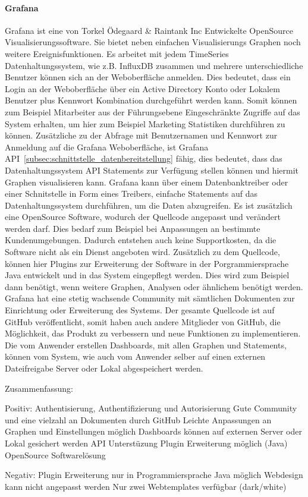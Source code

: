 \paragraph{Grafana}
\label{paragraph:grafana}
Grafana ist eine von Torkel Ödegaard \& Raintank Inc Entwickelte OpenSource
Visualisierungssoftware. Sie bietet neben einfachen Visualisierungs Graphen
noch weitere Ereignisfunktionen. Es arbeitet mit jedem TimeSeries
Datenhaltungssystem, wie z.B. InfluxDB zusammen und mehrere unterschiedliche
Benutzer können sich an der Weboberfläche anmelden. Dies bedeutet, dass ein
Login an der Weboberfläche über ein Active Directory Konto oder Lokalem
Benutzer plus Kennwort Kombination durchgeführt werden kann. Somit können zum
Beispiel Mitarbeiter aus der Führungsebene Eingeschränkte Zugriffe auf das
System erhalten, um hier zum Beispiel Marketing Statistiken durchführen zu
können. Zusätzliche zu der Abfrage mit Benutzernamen und Kennwort zur Anmeldung
auf die Grafana Weboberfläche, ist Grafana
API~\ref{subsec:schnittstelle_datenbereitstellung} fähig, dies bedeutet, dass
das Datenhaltungssystem API Statements zur Verfügung stellen können und hiermit
Graphen visualisieren kann. Grafana kann über einem Datenbanktreiber oder einer
Schnitstelle in Form eines Treibers, einfache Statements auf das
Datenhaltungssystem durchführen, um die Daten abzugreifen. Es ist zusätzlich
eine OpenSource Software, wodurch der Quellcode angepasst und verändert werden
darf. Dies bedarf zum Beispiel bei Anpassungen an bestimmte Kundenumgebungen.
Dadurch entstehen auch keine Supportkosten, da die Software nicht als ein
Dienst angeboten wird. Zusätzlich zu dem Quellcode, können hier Plugins zur
Erweiterung der Software in der Porgrammiersprache Java entwickelt und in das
System eingepflegt werden. Dies wird zum Beispiel dann benötigt, wenn weitere
Graphen, Analysen oder ähnlichem benötigt werden.  Grafana hat eine stetig
wachsende Community mit sämtlichen Dokumenten zur Einrichtung oder Erweiterung
des Systems. Der gesamte Quellcode ist auf GitHub veröffentlicht, somit haben
auch andere Mitglieder von GitHub, die Möglichkeit, das Produkt zu verbessern
und neue Funktionen zu implementieren. Die vom Anwender erstellen Dashboards,
mit allen Graphen und Statements, können vom System, wie auch vom Anwender
selber auf einen externen Dateifreigabe Server oder Lokal abgespeichert werden.

Zusammenfassung:
\begin{outline}
  Positiv:
  \1 Authentisierung, Authentifizierung und Autorisierung
  \1 Gute Community und eine vielzahl an Dokumenten durch GitHub
  \1 Leichte Anpassungen an Graphen und Einstellungen möglich
  \1 Dashboards können auf externen Server oder Lokal gesichert werden
  \1 API Unterstüzung
  \1 Plugin Erweiterung möglich (Java)
  \1 OpenSource Softwarelösung

  Negativ:
  \1 Plugin Erweiterung nur in Programmiersprache Java möglich
  \1 Webdesign kann nicht angepasst werden
  \1 Nur zwei Webtemplates verfügbar (dark/white)
\end{outline}

